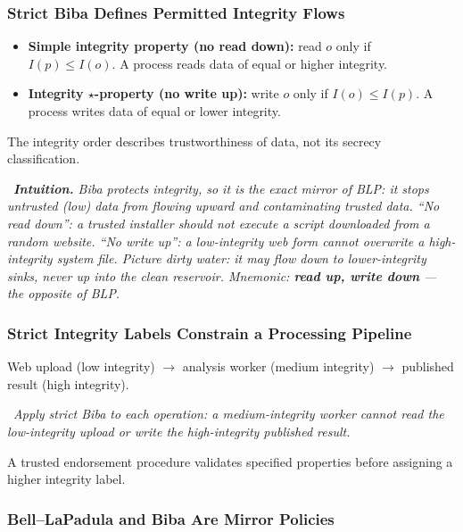 \documentclass[hidelinks]{article}
\newcommand{\callout}[1]{\par\smallskip\noindent{\color{capri}$\blacktriangleright$}\ \textit{#1}\par\smallskip}
\begin{document}
\subsubsection{Strict Biba Defines Permitted Integrity Flows}

\begin{itemize}
    \item \textbf{Simple integrity property (no read down):} read $o$ only if $I(p) \le I(o)$. A process reads data of equal or higher integrity.
    \item \textbf{Integrity $\star$-property (no write up):} write $o$ only if $I(o) \le I(p)$. A process writes data of equal or lower integrity.
\end{itemize}
The integrity order describes trustworthiness of data, not its secrecy classification.

\callout{\textbf{Intuition.} Biba protects \emph{integrity}, so it is the exact mirror of BLP: it stops \emph{untrusted} (low) data from flowing \emph{upward} and contaminating trusted data. ``No read down'': a trusted installer should not execute a script downloaded from a random website. ``No write up'': a low-integrity web form cannot overwrite a high-integrity system file. Picture dirty water: it may flow down to lower-integrity sinks, never up into the clean reservoir. Mnemonic: \textbf{read up, write down} --- the opposite of BLP.}

\subsubsection{Strict Integrity Labels Constrain a Processing Pipeline}

Web upload (low integrity) $\to$ analysis worker (medium integrity) $\to$ published result (high integrity).

\callout{Apply strict Biba to each operation: a medium-integrity worker cannot read the low-integrity upload or write the high-integrity published result.}

A trusted endorsement procedure validates specified properties before assigning a higher integrity label.

\subsubsection{Bell--LaPadula and Biba Are Mirror Policies}
\end{document}

